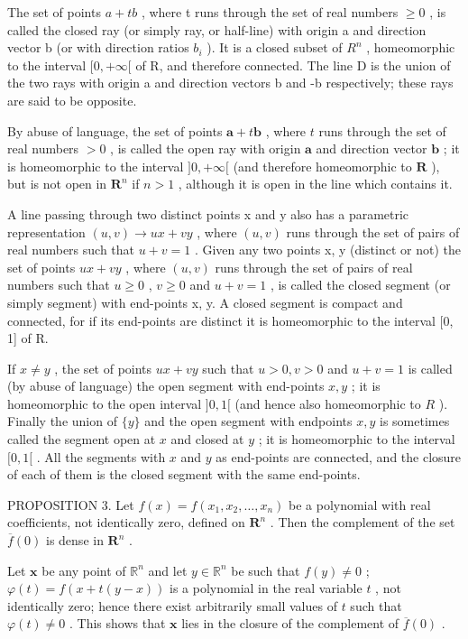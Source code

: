 The set of points \(a + tb\) , where t runs through the set of real numbers \(\geqslant 0\) , is called the closed ray (or simply ray, or half-line) with origin a and direction vector b (or with direction ratios \(b_{i}\) ). It is a closed subset of \(R^{n}\) , homeomorphic to the interval \([0, +\infty[\) of R, and therefore connected. The line D is the union of the two rays with origin a and direction vectors b and -b respectively; these rays are said to be opposite.

By abuse of language, the set of points \(\pmb{a} + t\pmb{b}\) , where \(t\) runs through the set of real numbers \(> 0\) , is called the open ray with origin \(\pmb{a}\) and direction vector \(\pmb{b}\) ; it is homeomorphic to the interval \(]0, +\infty[\) (and therefore homeomorphic to \(\mathbf{R}\) ), but is not open in \(\mathbf{R}^n\) if \(n > 1\) , although it is open in the line which contains it.

A line passing through two distinct points x and y also has a parametric representation \((u, v) \to ux + vy\) , where \((u, v)\) runs through the set of pairs of real numbers such that \(u + v = 1\) . Given any two points x, y (distinct or not) the set of points \(ux + vy\) , where \((u, v)\) runs through the set of pairs of real numbers such that \(u \geqslant 0\) , \(v \geqslant 0\) and \(u + v = 1\) , is called the closed segment (or simply segment) with end-points x, y. A closed segment is compact and connected, for if its end-points are distinct it is homeomorphic to the interval {[}0, 1{]} of R.

If \(x \neq y\) , the set of points \(ux + vy\) such that \(u > 0, v > 0\) and \(u + v = 1\) is called (by abuse of language) the open segment with end-points \(x, y\) ; it is homeomorphic to the open interval \(]0, 1[\) (and hence also homeomorphic to \(R\) ). Finally the union of \(\{y\}\) and the open segment with endpoints \(x, y\) is sometimes called the segment open at \(x\) and closed at \(y\) ; it is homeomorphic to the interval \([0, 1[\) . All the segments with \(x\) and \(y\) as end-points are connected, and the closure of each of them is the closed segment with the same end-points.

PROPOSITION 3. Let \(f(x) = f(x_1, x_2, \ldots, x_n)\) be a polynomial with real coefficients, not identically zero, defined on \(\mathbf{R}^n\) . Then the complement of the set \(\overline{f}(0)\) is dense in \(\mathbf{R}^n\) .

Let \(\pmb{x}\) be any point of \(\mathbb{R}^n\) and let \(y \in \mathbb{R}^n\) be such that \(f(y) \neq 0\) ; \(\varphi(t) = f(x + t(y - x))\) is a polynomial in the real variable \(t\) , not identically zero; hence there exist arbitrarily small values of \(t\) such that \(\varphi(t) \neq 0\) . This shows that \(\pmb{x}\) lies in the closure of the complement of \(\overline{f}(0)\) .


